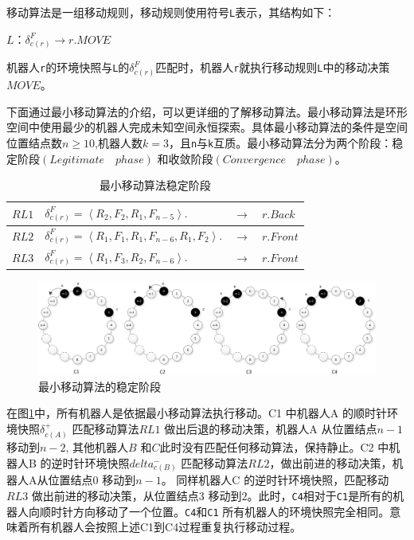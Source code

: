 移动算法是一组移动规则，移动规则使用符号\verb|L|表示，其结构如下：

 $ L ：\delta_{c\left(r\right)}^F  \rightarrow  r.MOVE $

机器人\verb|r|的环境快照与\verb|L|的$\delta_{c\left(r\right)}^F$匹配时，机器人\verb|r|就执行移动规则\verb|L|中的移动决策$MOVE$。

下面通过最小移动算法\cite{r5}的介绍，可以更详细的了解移动算法。最小移动算法是环形空间中使用最少的机器人完成未知空间永恒探索\cite{r5}。具体最小移动算法的条件是空间位置结点数$n \geq 10$,机器人数$k = 3$，且\verb|n|与\verb|k|互质。最小移动算法分为两个阶段：稳定阶段$\left(Legitimate\quad phase\right)$ 和收敛阶段$\left(Convergence\quad phase\right)$。

\begin{table}[hbt]
    \centering
    \caption{最小移动算法稳定阶段}
    \begin{tabular}{|p{2cm}|p{8cm}|p{2cm}|p{2cm}|}
        \hline
        $RL1$&$\delta_{c\left(r\right)}^F = \left\langle R_2,F_2,R_1,F_{n-5} \right\rangle.$&$\rightarrow$&$r.Back$\\
        \hline
        $RL2$&$\delta_{c\left(r\right)}^F = \left\langle R_1,F_1,R_1,F_{n-6},R_1,F_2 \right\rangle.$&$\rightarrow$&$r.Front$\\
        \hline
        $RL3$&$\delta_{c\left(r\right)}^F = \left\langle R_1,F_3,R_2,F_{n-6}\right\rangle.$&$\rightarrow$&$r.Front$\\
        \hline
    \end{tabular}
    \label{table:minalgotithm}
\end{table}

\vspace{0.5cm}

\begin{figure}[!hbt]
	\centering
	\includegraphics[width=6.5 in]{fig/perpetualexploration.png}
	\caption{最小移动算法的稳定阶段}
	\label{fig:perpetualexploration}
\end{figure}

在图\ref{fig:perpetualexploration}中，所有机器人是依据最小移动算法执行移动。C1 中机器人A 的顺时针环境快照$\delta_{c\left( A\right)}^+$ 匹配移动算法$RL1$ 做出后退的移动决策，机器人A 从位置结点$n-1$移动到$n-2$, 其他机器人$B$ 和$C$此时没有匹配任何移动算法，保持静止。C2 中机器人B 的逆时针环境快照${delta_{c\left( B\right)}^-}$ 匹配移动算法$RL2$，做出前进的移动决策，机器人A从位置结点$0$ 移动到$n-1$。 同样机器人C 的逆时针环境快照，匹配移动$RL3$ 做出前进的移动决策，从位置结点$3$ 移动到$2$。此时，\verb|C4|相对于\verb|C1|是所有的机器人向顺时针方向移动了一个位置。\verb|C4|和\verb|C1| 所有机器人的环境快照完全相同。意味着所有机器人会按照上述C1到C4过程重复执行移动过程。

